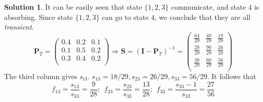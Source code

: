 \documentclass[a4paper, 10pt]{article}
\theoremstyle{definition}
\theoremstyle{hSol}
\newtheorem*{solution}{Solution}
\begin{document}
\begin{solution} It can be easily seen that state $\{1,2,3\}$ communicate, and state $4$ is absorbing. Since state $\{1,2,3\}$ can go to state $4$, we conclude that they are all \textit{transient}.
\begin{equation}
  \bm{P}_T = \begin{pmatrix}
    0.4 & 0.2 & 0.1 \\
    0.1 & 0.5 & 0.2 \\
    0.3 & 0.4 & 0.2 \\
  \end{pmatrix} \Rightarrow \bm{S}=(\bm{I}-\bm{P}_T)^{-1} =
  \begin{pmatrix}
    \frac{64}{29} & \frac{40}{29} & \frac{18}{29} \\[5pt]
    \frac{28}{29} & \frac{90}{29} & \frac{26}{29} \\[5pt]
    \frac{38}{29} & \frac{60}{29} & \frac{56}{29} \\[5pt]
  \end{pmatrix}
\end{equation}
The third column gives $s_{i3}$. $s_{13}=18/29, s_{23}=26/29, s_{33}=56/29$. It follows that
\begin{equation}
  f_{13} = \frac{s_{13}}{s_{33}}=\frac{9}{28};~~f_{23}=\frac{s_{23}}{s_{33}} = \frac{13}{28};~~f_{33}=\frac{s_{33}-1}{s_{33}} = \frac{27}{56}
\end{equation}
\end{solution}
\end{document}
